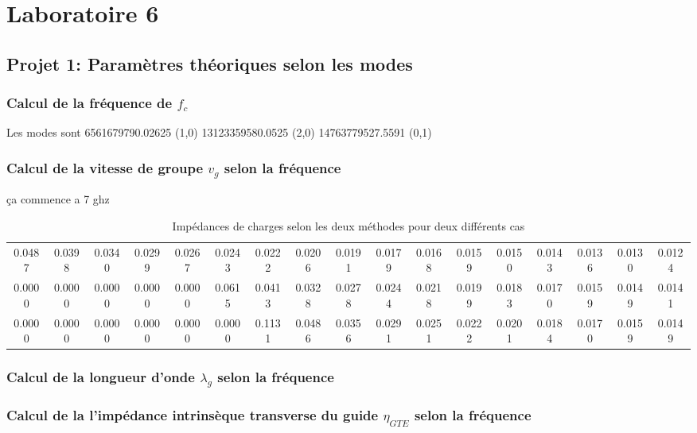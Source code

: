 



\label{s:experimentation}
\chapter{Laboratoire 6}
\section{Projet 1: Paramètres théoriques selon les modes}
\subsection{Calcul de la fréquence de $f_c$}
Les modes sont   
6561679790.02625 (1,0)
13123359580.0525 (2,0)
14763779527.5591 (0,1)

\subsection{Calcul de la vitesse de groupe $v_g$ selon la fréquence}

ça commence a 7 ghz
  \begin{table}[htbp]
    \centering
    \begin{tabular}{|c|c|c|c|c|c|c|c|c|c|c|c|c|c|c|c|c|} \hline
	0.0487 & 0.0398 & 0.0340 & 0.0299 & 0.0267 & 0.0243 & 0.0222 & 0.0206 & 0.0191 & 0.0179 & 0.0168 & 0.0159 & 0.0150 & 0.0143 & 0.0136 & 0.0130 & 0.0124\\ 
	0.0000 & 0.0000 & 0.0000 & 0.0000 & 0.0000 & 0.0615 & 0.0413 & 0.0328 & 0.0278 & 0.0244 & 0.0218 & 0.0199 & 0.0183 & 0.0170 & 0.0159 & 0.0149 & 0.0141\\ 
	0.0000 & 0.0000 & 0.0000 & 0.0000 & 0.0000 & 0.0000 & 0.1131 & 0.0486 & 0.0356 & 0.0291 & 0.0251 & 0.0222 & 0.0201 & 0.0184 & 0.0170 & 0.0159 & 0.0149 \\\hline
    
    \end{tabular}%
        \caption{Impédances de charges selon les deux méthodes pour deux différents cas}
    \label{tab:4}%
\end{table}%



\subsection{Calcul de la longueur d'onde $\lambda_g$ selon la fréquence}

\subsection{Calcul de la l'impédance intrinsèque transverse du guide $\eta_{GTE}$ selon la fréquence}